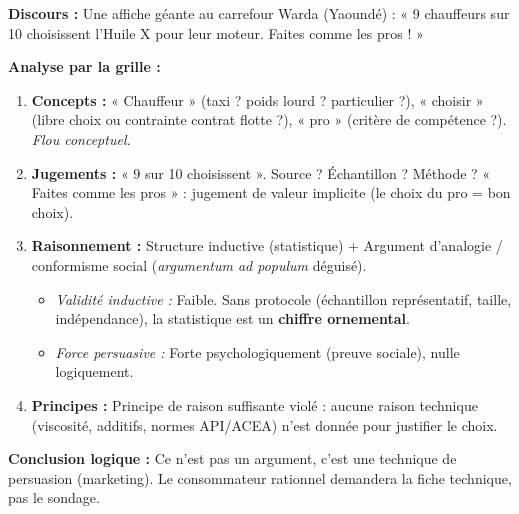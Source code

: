 \documentclass[11pt]{article}
\newcommand{\cle}[1]{{\popxbold\color{popdark}#1}}
\begin{document}
\begin{exemplebox}
\textbf{Discours :} Une affiche géante au carrefour Warda (Yaoundé) : « 9 chauffeurs sur 10 choisissent l'Huile X pour leur moteur. Faites comme les pros ! »

\textbf{Analyse par la grille :}
\begin{enumerate}
    \item \textbf{Concepts :} « Chauffeur » (taxi ? poids lourd ? particulier ?), « choisir » (libre choix ou contrainte contrat flotte ?), « pro » (critère de compétence ?). \textit{Flou conceptuel.}
    \item \textbf{Jugements :} « 9 sur 10 choisissent ». Source ? Échantillon ? Méthode ? « Faites comme les pros » : jugement de valeur implicite (le choix du pro = bon choix).
    \item \textbf{Raisonnement :} Structure inductive (statistique) + Argument d'analogie / conformisme social (\textit{argumentum ad populum} déguisé).
    \begin{itemize}
        \item \textit{Validité inductive :} Faible. Sans protocole (échantillon représentatif, taille, indépendance), la statistique est un \textbf{chiffre ornemental}.
        \item \textit{Force persuasive :} Forte psychologiquement (preuve sociale), nulle logiquement.
    \end{itemize}
    \item \textbf{Principes :} Principe de raison suffisante violé : aucune raison technique (viscosité, additifs, normes API/ACEA) n'est donnée pour justifier le choix.
\end{enumerate}
\textbf{Conclusion logique :} Ce n'est pas un argument, c'est une \cle{technique de persuasion} (marketing). Le consommateur rationnel demandera la fiche technique, pas le sondage.
\end{exemplebox}
\end{document}
